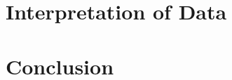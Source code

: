 \documentclass[letterpaper,twocolumn,amsmath,amssymb,pre]{revtex4-1}
\newcommand\micron{\ensuremath{\mu\text{m}}}
\begin{document}





\section{Interpretation of Data}
\section{Conclusion}

\end{document}
